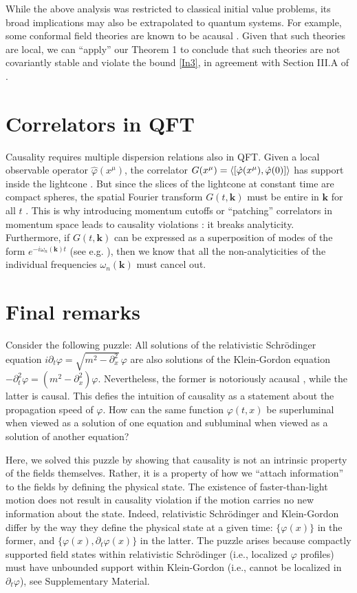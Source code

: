 \documentclass[prl, amsfonts, amssymb, amsmath, nofootinbib,reprint, showkeys, twoside,notitlepage]{revtex4-2}
\theoremstyle{definition}
\theoremstyle{theorem}
\theoremstyle{corollary}
\begin{document}
While the above analysis was restricted to classical initial value problems, its broad implications may also be extrapolated to quantum systems. For example, some conformal field theories are known to be acausal \cite{Brigante:2008gz}. Given that such theories are local, we can ``apply'' our Theorem 1 to conclude that such theories are not covariantly stable and violate the bound \eqref{In3}, in agreement with Section III.A of \cite{GavassinoSuperluminal2021}. 


\section{Correlators in QFT} Causality requires multiple dispersion relations also in QFT. Given a local observable operator $\hat{\varphi}(x^\mu)$, the correlator $G(x^\mu)=\braket{[\hat{\varphi}(x^\mu),\hat{\varphi}(0)]}$  has support inside the lightcone \cite{Peskin_book}. But since the slices of the lightcone at constant time are compact spheres, the spatial Fourier transform $G(t,\textbf{k})$ must be entire in $\textbf{k}$ for all $t$
\cite{Hormander_book}. This is why introducing momentum cutoffs or ``patching'' correlators in momentum space leads to causality violations \cite{Henning_1995ft}: it breaks analyticity. Furthermore, if $G(t,\textbf{k})$ can be expressed as a superposition of modes of the form $e^{-i\omega_n(\textbf{k})t}$ (see e.g. \cite{Lowdon_2022yct}), then we know that all the non-analyticities of the individual frequencies $\omega_n(\textbf{k})$ must cancel out. 



\section{Final remarks}Consider the following puzzle: All solutions of the relativistic Schr\"{o}dinger equation  $i\partial_t \varphi {=} \sqrt{m^2{-}\partial^2_x}\, \varphi$
are also solutions of the Klein-Gordon equation $-\partial^2_t\varphi {=} (m^2{-}\partial^2_x)\varphi$. Nevertheless, the former is notoriously acausal \cite{Peskin_book}, while the latter is causal. This defies the intuition of causality as a statement about the propagation speed of $\varphi$. How can the same function $\varphi(t,x)$ be superluminal when viewed as a solution of one equation and subluminal when viewed as a solution of another equation?

Here, we solved this puzzle by showing that causality is not an intrinsic property of the fields themselves. Rather, it is a property of how we ``attach information'' to the fields by defining the physical state. The existence of faster-than-light motion does not result in causality violation if the motion carries no new information about the state. Indeed, relativistic Schr\"odinger and Klein-Gordon differ by the way they define the physical state at a given time: $\{\varphi(x)\}$ in the former, and $\{\varphi(x),\partial_t \varphi(x)\}$ in the latter. The puzzle arises because compactly supported field states within relativistic Schr\"odinger (i.e., localized $\varphi$ profiles) must have unbounded support within Klein-Gordon (i.e., cannot be localized in $\partial_t \varphi$), see Supplementary Material.
\end{document}
